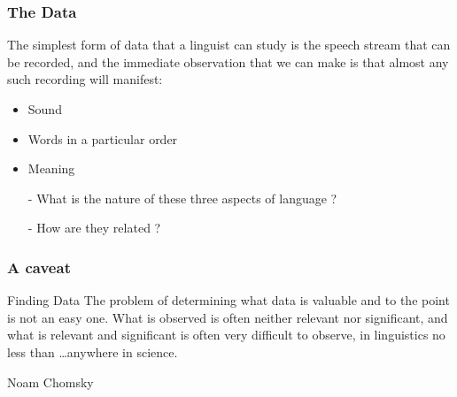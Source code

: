 \begin{frame}[label={fr}]
  \frametitle{The Data}

The simplest form of data that a linguist can study is the speech stream that can be recorded, and the immediate observation that we can make is that almost any such recording will manifest:

\begin{itemize}
\item Sound
\item Words in a particular order 
\item Meaning
\end{itemize}

\pause


\begin{itemize}
\item[-] What is the nature of these three aspects of language ?
\item[-] How are they related ?
\end{itemize}

\end{frame}


\begin{frame}
  \frametitle{A caveat}

  \begin{block}
{Finding Data}
    The problem of determining what data is valuable and to the point is not an easy one. What is observed is often neither relevant nor significant, and what is relevant and significant is often very difficult to observe, in linguistics no less than \ldots anywhere in science.
\begin{flushright}
Noam Chomsky
\end{flushright}
  \end{block}

\end{frame}


